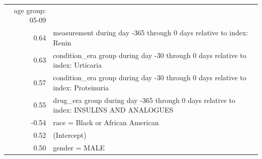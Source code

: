 \documentclass[11pt]{book}
\theoremstyle{definition}
\theoremstyle{definition}
\theoremstyle{definition}
\theoremstyle{remark}
\begin{document}
\begin{longtable}[]{@{}rl@{}}
\begin{minipage}[t]{0.87\columnwidth}
age group: 05-09\strut
\end{minipage}\tabularnewline
\begin{minipage}[t]{0.07\columnwidth}\raggedleft\strut
0.64\strut
\end{minipage} & \begin{minipage}[t]{0.87\columnwidth}\raggedright\strut
measurement during day -365 through 0 days relative to index:
Renin\strut
\end{minipage}\tabularnewline
\begin{minipage}[t]{0.07\columnwidth}\raggedleft\strut
0.63\strut
\end{minipage} & \begin{minipage}[t]{0.87\columnwidth}\raggedright\strut
condition\_era group during day -30 through 0 days relative to index:
Urticaria\strut
\end{minipage}\tabularnewline
\begin{minipage}[t]{0.07\columnwidth}\raggedleft\strut
0.57\strut
\end{minipage} & \begin{minipage}[t]{0.87\columnwidth}\raggedright\strut
condition\_era group during day -30 through 0 days relative to index:
Proteinuria\strut
\end{minipage}\tabularnewline
\begin{minipage}[t]{0.07\columnwidth}\raggedleft\strut
0.55\strut
\end{minipage} & \begin{minipage}[t]{0.87\columnwidth}\raggedright\strut
drug\_era group during day -365 through 0 days relative to index:
INSULINS AND ANALOGUES\strut
\end{minipage}\tabularnewline
\begin{minipage}[t]{0.07\columnwidth}\raggedleft\strut
-0.54\strut
\end{minipage} & \begin{minipage}[t]{0.87\columnwidth}\raggedright\strut
race = Black or African American\strut
\end{minipage}\tabularnewline
\begin{minipage}[t]{0.07\columnwidth}\raggedleft\strut
0.52\strut
\end{minipage} & \begin{minipage}[t]{0.87\columnwidth}\raggedright\strut
(Intercept)\strut
\end{minipage}\tabularnewline
\begin{minipage}[t]{0.07\columnwidth}\raggedleft\strut
0.50\strut
\end{minipage} & \begin{minipage}[t]{0.87\columnwidth}\raggedright\strut
gender = MALE\strut
\end{minipage}\tabularnewline
\bottomrule
\end{longtable}
\end{document}
